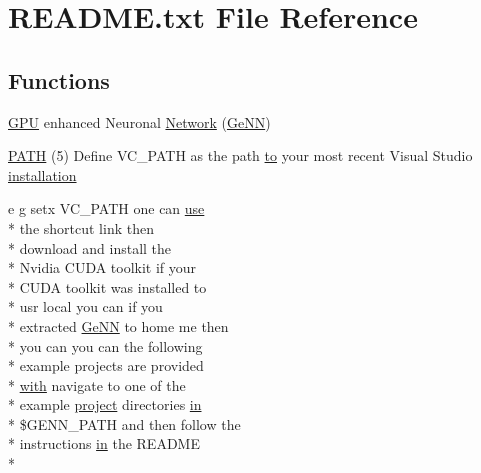 \hypertarget{README_8txt}{\section{R\+E\+A\+D\+M\+E.\+txt File Reference}
\label{README_8txt}
}
\subsection*{Functions}
\begin{DoxyCompactItemize}
\item 
\hyperlink{modelSpec_8h_a39cb9803524b6f3b783344b2f89867b4}{G\+P\+U} enhanced Neuronal \hyperlink{README_8txt_a80b7dde9a48ade6d7ed94eaff36b1be7}{Network} (\hyperlink{README_8txt_a431a8d9aae97c72793fee7c3edd68559}{Ge\+N\+N})
\item 
\hyperlink{README_8txt_a29ba391c6d01bec8505415f2cab6abad}{P\+A\+T\+H} (5) Define V\+C\+\_\+\+P\+A\+T\+H as the path \hyperlink{README_8txt_add1f2ee32acc15ef77f839d4382c9768}{to} your most recent Visual Studio \hyperlink{README_8txt_a7de61c69397952ab48b198ee4fe495bc}{installation}
\item 
e g setx V\+C\+\_\+\+P\+A\+T\+H one can \hyperlink{README_8txt_acf386c48a14a2099c9220d6bcde40fc8}{use} \\*
the shortcut link then \\*
download and install the \\*
Nvidia C\+U\+D\+A toolkit if your \\*
C\+U\+D\+A toolkit was installed to \\*
usr local you can if you \\*
extracted \hyperlink{README_8txt_a431a8d9aae97c72793fee7c3edd68559}{Ge\+N\+N} to home me then \\*
you can you can the following \\*
example projects are provided \\*
\hyperlink{userproject_2OneComp__project_2README_8txt_ace09bb40fbf4457ad9a9340a67a4fa9a}{with} navigate to one of the \\*
example \hyperlink{userproject_2SynDelay__project_2README_8txt_a762c750134e07a31b7965860fd292b51}{project} directories \hyperlink{README_8txt_a148897a6b2cc9cff25af80abb13426b0}{in} \\*
\$G\+E\+N\+N\+\_\+\+P\+A\+T\+H and then follow the \\*
instructions \hyperlink{README_8txt_a148897a6b2cc9cff25af80abb13426b0}{in} the R\+E\+A\+D\+M\+E \\*

\end{DoxyCompactItemize}
